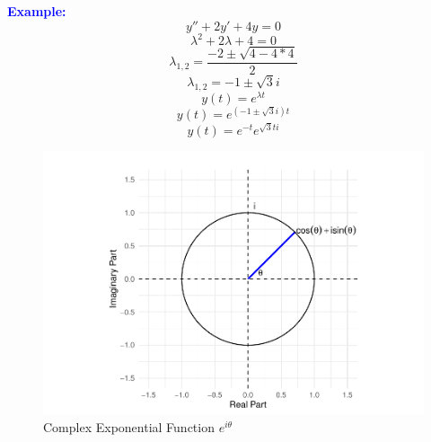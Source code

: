 \documentclass[
  11pt,
]{article}
\begin{document}
\textbf{\textcolor{blue}{Example:}} \[y''+2y'+4y=0\]
\[\lambda^2+2 \lambda + 4 = 0\]
\[\lambda_{1,2} = \frac{-2 \pm \sqrt{4-4*4}}{2}\]
\[\lambda_{1,2}=-1 \pm \sqrt{3}i\] \[y(t)=e^{\lambda t}\]
\[y(t)=e^{(-1 \pm \sqrt{3}i)t}\] \[y(t)=e^{-t}e^{\sqrt{3}ti} \tag{1}\]

\begin{figure}
\centering
\includegraphics{differential_files/figure-latex/difference5-1.pdf}
\caption{Complex Exponential Function \(e^{iθ}\)}
\end{figure}
\end{document}
